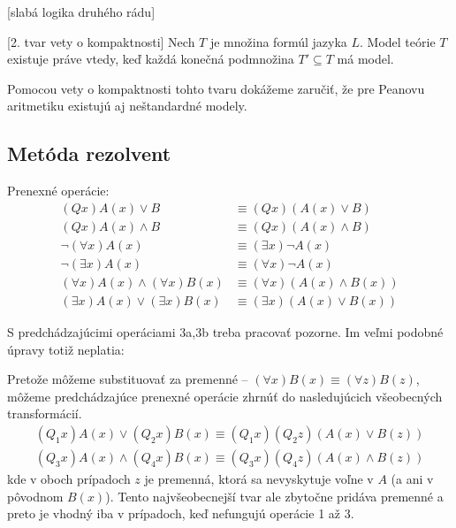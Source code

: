\documentclass[a4paper]{report}
\newenvironment{dokaz}{\smallskip \par \noindent{\bfseries D:}}{}
\newenvironment{priklad}{\smallskip \par \noindent{\bfseries Príkl:}}{}
\newenvironment{veta}{\smallskip \par \noindent{\bfseries Veta:}}{}
\newenvironment{poznamka}{\smallskip \par \noindent{\bfseries Pozn:}}{}
\begin{document}
\begin{poznamka}[slabá logika druhého rádu]
\end{poznamka}

\begin{veta}[2. tvar vety o kompaktnosti]
    Nech $T$ je množina formúl jazyka $L$. 
    Model teórie $T$ existuje práve vtedy, keď každá konečná podmnožina
    $T' \subseteq T$ má model.
\end{veta}

\begin{dokaz}
\end{dokaz}

\begin{priklad}
    Pomocou vety o kompaktnosti tohto tvaru dokážeme zaručiť,
    že pre Peanovu aritmetiku existujú aj neštandardné modely.
\end{priklad}

\subsection{Metóda rezolvent}
Prenexné operácie:
\begin{align*}
    (Qx)A(x) \lor B &\equiv (Qx)(A(x) \lor B) \tag{1a}\\
    (Qx)A(x) \land B &\equiv (Qx)(A(x) \land B) \tag{1b}\\
    \neg (\forall x) A(x) &\equiv (\exists x) \neg A(x) \tag{2a}\\
    \neg (\exists x) A(x) &\equiv (\forall x) \neg A(x) \tag{2b}\\
    (\forall x) A(x) \land (\forall x) B(x) &\equiv 
        (\forall x) (A(x) \land B(x)) \tag{3a}\\
    (\exists x) A(x) \lor (\exists x) B(x) &\equiv
        (\exists x) (A(x) \lor B(x)) \tag{3b}
\end{align*}
\begin{poznamka}
    S predchádzajúcimi operáciami 3a,3b treba pracovať pozorne. Im veľmi
    podobné úpravy totiž neplatia:
\end{poznamka}

Pretože môžeme substituovať za premenné --
    $(\forall x) B(x) \equiv (\forall z) B(z)$, môžeme predchádzajúce
prenexné operácie zhrnúť do nasledujúcich všeobecných transformácií.
\begin{align*}
    (Q_1 x)A(x) \lor (Q_2 x)B(x) \equiv 
        (Q_1 x)(Q_2 z)(A(x) \lor B(z)) \tag{4a} \\
    (Q_3 x)A(x) \land (Q_4 x)B(x) \equiv
        (Q_3 x)(Q_4 z)(A(x) \land B(z)) \tag{4b}
\end{align*} 
kde v oboch prípadoch $z$ je premenná, ktorá sa nevyskytuje voľne v $A$
(a ani v pôvodnom $B(x)$).
Tento najvšeobecnejší tvar ale zbytočne pridáva premenné a preto je
vhodný iba v prípadoch, keď nefungujú operácie 1 až 3.
\end{document}

